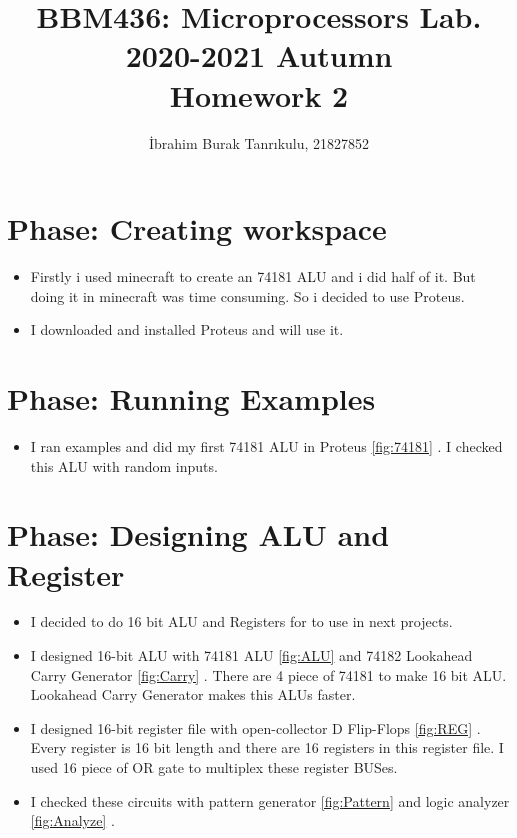 \documentclass[11pt]{article}
\begin{document}
\author{İbrahim Burak Tanrıkulu, 21827852}
\title{BBM436: Microprocessors Lab.\\2020-2021 Autumn\\Homework 2}
\maketitle

\section{Phase: Creating workspace}

\begin{itemize}
    \item {Firstly i used minecraft to create an 74181 ALU and i did half of it. But doing it in minecraft was time consuming. So i decided to use Proteus.}
    \item {I downloaded and installed Proteus and will use it.}
\end{itemize}

\section{Phase: Running Examples}

\begin{itemize}
    \item {I ran examples and did my first 74181 ALU in Proteus \ref{fig:74181} . I checked this ALU with random inputs.}
\end{itemize}

\section{Phase: Designing ALU and Register}

\begin{itemize}
    \item {I decided to do 16 bit ALU and Registers for to use in next projects.}
    \item {I designed 16-bit ALU with 74181 ALU \ref{fig:ALU} and 74182 Lookahead Carry Generator \ref{fig:Carry} . }
    \newline There are 4 piece of 74181 to make 16 bit ALU. Lookahead Carry Generator makes this ALUs faster.
    \item {I designed 16-bit register file with open-collector D Flip-Flops \ref{fig:REG} . }
    \newline Every register is 16 bit length and there are 16 registers in this register file. 
    \newline I used 16 piece of OR gate to multiplex these register BUSes.
    \item {I checked these circuits with pattern generator \ref{fig:Pattern} and logic analyzer \ref{fig:Analyze} . }
\end{itemize}
 
\end{document}
